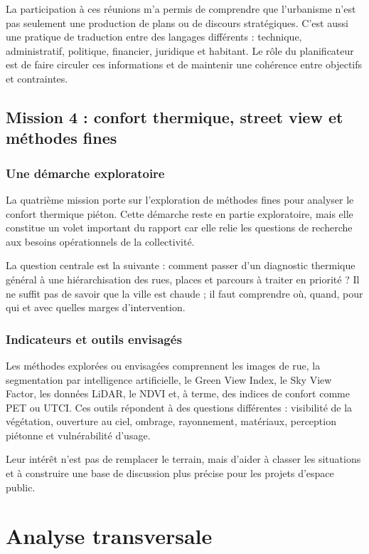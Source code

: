 \documentclass[11pt,a4paper]{report}
\begin{document}
La participation à ces réunions m'a permis de comprendre que l'urbanisme n'est pas seulement une production de plans ou de discours stratégiques. C'est aussi une pratique de traduction entre des langages différents : technique, administratif, politique, financier, juridique et habitant. Le rôle du planificateur est de faire circuler ces informations et de maintenir une cohérence entre objectifs et contraintes.

\section{Mission 4 : confort thermique, street view et méthodes fines}

\subsection{Une démarche exploratoire}

La quatrième mission porte sur l'exploration de méthodes fines pour analyser le confort thermique piéton. Cette démarche reste en partie exploratoire, mais elle constitue un volet important du rapport car elle relie les questions de recherche aux besoins opérationnels de la collectivité.

La question centrale est la suivante : comment passer d'un diagnostic thermique général à une hiérarchisation des rues, places et parcours à traiter en priorité ? Il ne suffit pas de savoir que la ville est chaude ; il faut comprendre où, quand, pour qui et avec quelles marges d'intervention.

\subsection{Indicateurs et outils envisagés}

Les méthodes explorées ou envisagées comprennent les images de rue, la segmentation par intelligence artificielle, le Green View Index, le Sky View Factor, les données LiDAR, le NDVI et, à terme, des indices de confort comme PET ou UTCI. Ces outils répondent à des questions différentes : visibilité de la végétation, ouverture au ciel, ombrage, rayonnement, matériaux, perception piétonne et vulnérabilité d'usage.

Leur intérêt n'est pas de remplacer le terrain, mais d'aider à classer les situations et à construire une base de discussion plus précise pour les projets d'espace public.

\chapter{Analyse transversale}
\end{document}
